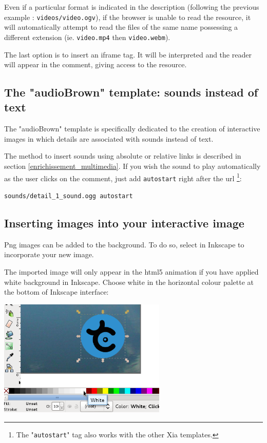 Even if a particular format is indicated in the description (following 
the previous example : \verb|videos/video.ogv|), if the browser is 
unable to read the resource, it will automatically attempt to read the files 
of the same name possessing a different extension (ie. \verb|video.mp4| 
then \verb|video.webm|).

The last option is to insert an iframe tag.
It will be interpreted and the reader will appear in the comment, 
giving access to the resource.

\subsection{The "audioBrown" template: sounds instead of text}\label{audioBrownsection}

The "audioBrown" template is specifically dedicated to the creation of 
interactive images in which details are associated with sounds instead of text.

The method to insert sounds using absolute or relative links is described in 
section 
\ref{enrichissement_multimedia}. If you wish the sound to play 
automatically as the user clicks on the comment, just add \verb|autostart| right 
after the url \footnote{The "\texttt{autostart}" tag also works with the other 
Xia templates.}:\\
\begin{center}
 \verb|sounds/detail_1_sound.ogg autostart|
\end{center}


\subsection{Inserting images into your interactive image}\label{insertion_images}

Png images can be added to the background. To do so, select  in 
Inkscape to incorporate your new image.

The imported image will only appear in the html5 animation if you have applied white background in 
Inkscape. Choose white in the horizontal colour palette at the bottom of 
Inkscape interface:\\

\begin{center}
\includegraphics[width=0.6\textwidth]{images/remplissage_blanc}\\ 
\end{center}


